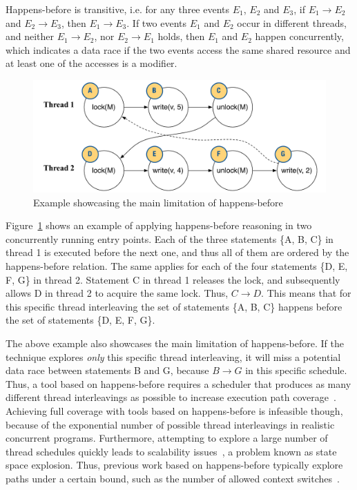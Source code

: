 Happens-before is transitive, i.e. for any three events $E_1$, $E_2$ and $E_3$, if $E_1 \rightarrow E_2$ and $E_2 \rightarrow E_3$, then $E_1 \rightarrow E_3$. If two events $E_1$ and $E_2$ occur in different threads, and neither $E_1 \rightarrow E_2$, nor $E_2 \rightarrow E_1$ holds, then $E_1$ and $E_2$ happen concurrently, which indicates a data race if the two events access the same shared resource and at least one of the accesses is a modifier.

\begin{figure}[htbp]
\centering
\includegraphics[width=1\linewidth]{img/happens_before.pdf}
\caption{Example showcasing the main limitation of happens-before}
\label{fig:happens_before}
\end{figure}

Figure~\ref{fig:happens_before} shows an example of applying happens-before reasoning in two concurrently running entry points. Each of the three statements \{A, B, C\} in thread 1 is executed before the next one, and thus all of them are ordered by the happens-before relation. The same applies for each of the four statements \{D, E, F, G\} in thread 2. Statement C in thread 1 releases the lock, and subsequently allows D in thread 2 to acquire the same lock. Thus, $C \rightarrow D$. This means that for this specific thread interleaving the set of statements \{A, B, C\} happens before the set of statements \{D, E, F, G\}.

The above example also showcases the main limitation of happens-before. If the technique explores \emph{only} this specific thread interleaving, it will miss a potential data race between statements B and G, because $B \rightarrow G$ in this specific schedule. Thus, a tool based on happens-before requires a scheduler that produces as many different thread interleavings as possible to increase execution path coverage~\cite{savage1997eraser}. Achieving full coverage with tools based on happens-before is infeasible though, because of the exponential number of possible thread interleavings in realistic concurrent programs. Furthermore, attempting to explore a large number of thread schedules quickly leads to scalability issues~\cite{musuvathi2008finding}, a problem known as state space explosion. Thus, previous work based on happens-before typically explore paths under a certain bound, such as the number of allowed context switches~\cite{qadeer2004kiss}.

